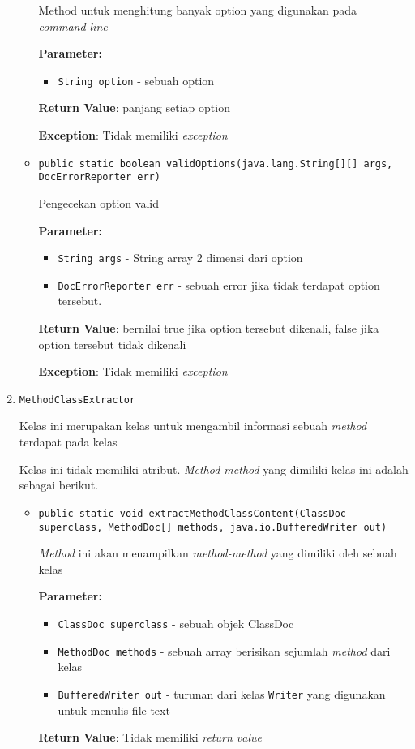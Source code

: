 \documentclass{article}
\begin{document}
\begin{enumerate}
\begin{itemize}
Method untuk menghitung banyak option yang digunakan pada
 \textit{command-line}

\textbf{Parameter:}
\begin{itemize}
\item \texttt{String option} - 
sebuah option
\end{itemize}
\textbf{Return Value}: panjang setiap option

\textbf{Exception}: Tidak memiliki \textit{exception}

\item \texttt{public static boolean validOptions(java.lang.String[][] args, DocErrorReporter err)}

Pengecekan option valid

\textbf{Parameter:}
\begin{itemize}
\item \texttt{String args} - 
String array 2 dimensi dari option
\item \texttt{DocErrorReporter err} - 
sebuah error jika tidak terdapat option tersebut.
\end{itemize}
\textbf{Return Value}: bernilai true jika option tersebut dikenali, false jika option
 tersebut tidak dikenali

\textbf{Exception}: Tidak memiliki \textit{exception}

\end{itemize}
\item \texttt{MethodClassExtractor}

Kelas ini merupakan kelas untuk mengambil informasi sebuah \textit{method}
 terdapat pada kelas

Kelas ini tidak memiliki atribut. \textit{Method-method} yang dimiliki kelas ini adalah sebagai berikut.
\begin{itemize}
\item \texttt{public static void extractMethodClassContent(ClassDoc superclass, MethodDoc[] methods, java.io.BufferedWriter out)}

\textit{Method} ini akan menampilkan \textit{method-method} yang dimiliki
 oleh sebuah kelas

\textbf{Parameter:}
\begin{itemize}
\item \texttt{ClassDoc superclass} - 
sebuah objek ClassDoc
\item \texttt{MethodDoc methods} - 
sebuah array berisikan sejumlah \textit{method} dari kelas
\item \texttt{BufferedWriter out} - 
turunan dari kelas \texttt{Writer} yang digunakan untuk menulis
                   file text
\end{itemize}
\textbf{Return Value}: Tidak memiliki \textit{return value}


\end{itemize}
\end{enumerate}
\end{document}
